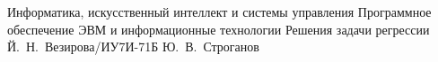 \documentclass{bmstu}
\begin{document}
    \makeresearchtitle
    {Информатика, искусственный интеллект и системы управления} %
    {Программное обеспечение ЭВМ и информационные технологии} %
    {Решения задачи регрессии} %
    {Й.~Н.~Везирова/ИУ7И-71Б} %
    {Ю.~В.~Строганов} %
    {} %

    \setcounter{page}{3}

    

    \maketableofcontents

    
    
    
    

    \makebibliography

    
    
\end{document}
